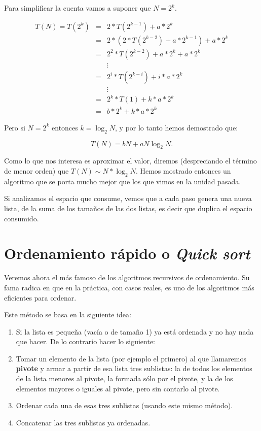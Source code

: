 Para simplificar la cuenta vamos a suponer que $N = 2^k$.

\begin{eqnarray}
T(N) = T(2^k) &=& 2 * T(2^{k-1}) + a * 2^k \\
              &=& 2 * \left( 2*T(2^{k-2} ) + a * 2^{k-1} \right) + a * 2^k\\
&=& 2^2*T(2^{k-2} ) + a*2^k + a*2^k\\
&&\vdots\\
&=& 2^i* T(2^{k-i})+ i * a * 2^k\\
&&\vdots\\
&=& 2^k*T(1) + k * a * 2^k\\
&=& b * 2^k  + k * a * 2^k
\end{eqnarray}

Pero si $N = 2^k$ entonces $k=\log_2N$, y por lo tanto hemos demostrado
que:

\begin{equation}
T(N) = b N + a N \log_2N.
\end{equation}

Como lo que nos interesa es aproximar el valor, diremos (despreciando el
término de menor orden) que $T(N) \sim N*\log_2N$. Hemos mostrado entonces
un algoritmo que se porta mucho mejor que los que vimos en la unidad
pasada.

Si analizamos el espacio que consume, vemos que a cada paso genera una
nueva lista, de la suma de los tamaños de las dos listas, es decir que 
duplica el espacio consumido.

\section{Ordenamiento rápido o {\it Quick sort}}

Veremos ahora el más famoso de los algoritmos recursivos de ordenamiento.
Su fama radica en que en la práctica, con casos reales, es uno de los
algoritmos más eficientes para ordenar.

Este método se basa en la siguiente idea:

\begin{enumerate}
\item Si la lista es pequeña (vacía o de tamaño 1) ya está ordenada y
no hay nada que hacer. De lo contrario hacer lo siguiente:

\item Tomar un elemento de la lista (por ejemplo el primero) al que
llamaremos {\bf pivote} y armar a partir de esa lista tres sublistas: la de
todos los elementos de la lista menores al pivote, la formada sólo por el
pivote, y la de los elementos mayores o iguales al pivote, pero sin
contarlo al pivote.

\item Ordenar cada una de esas tres sublistas (usando este mismo método).

\item Concatenar las tres sublistas ya ordenadas.
\end{enumerate}

